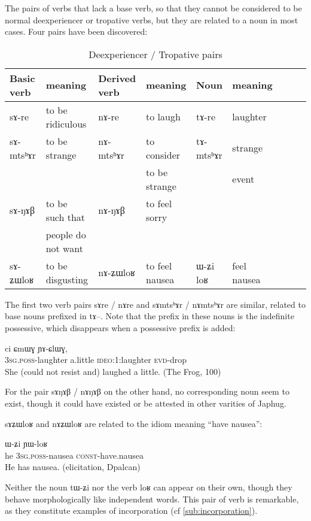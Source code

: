 \documentclass[oldfontcommands,oneside,a4paper,11pt]{memoir}
\newcommand{\ipa}[1]{{\phon #1}} %
\newcommand{\const}{\textsc{const}}
\newcommand{\evd}{\textsc{evd}}
\newcommand{\poss}{\textsc{poss}}
\newcommand{\sg}{\textsc{sg}}
\begin{document}
The pairs of  verbs that lack a base verb, so that they cannot be considered to be normal deexperiencer or tropative verbs, but they  are related to a noun in most cases. Four pairs have been discovered:
\begin{table}[H]
\caption{Deexperiencer / Tropative pairs } 
\begin{tabular}{lllllllll} \toprule
 
Basic verb	&meaning	&Derived verb	&meaning &Noun	&meaning\\
\midrule
\ipa{sɤ-re}  &	to be ridiculous 	& \ipa{nɤ-re}  &	  to laugh &\ipa{tɤ-re}  &	  laughter\\
\ipa{sɤ-mtsʰɤr}  &	to be strange 	& \ipa{nɤ-mtsʰɤr}  &	  to consider  &\ipa{tɤ-mtsʰɤr}  &	 strange\\

&&& to be strange && event \\
\ipa{sɤ-ŋɤβ}  &	to be such that   	& \ipa{nɤ-ŋɤβ}  &	  to feel sorry  & \\
& people do not want   \\
\ipa{sɤ-ʑɯloʁ}  &	to be disgusting 	& \ipa{nɤ-ʑɯloʁ}  &	  to feel nausea   & \ipa{ɯ-ʑi} \ipa{loʁ} & feel nausea \\ 
\bottomrule
\end{tabular}
\end{table}
The first two verb pairs \ipa{sɤre} / \ipa{nɤre} and  \ipa{sɤmtsʰɤr} / \ipa{nɤmtsʰɤr} are similar, related to base nouns prefixed in \ipa{tɤ}--. Note that the prefix in these nouns is the indefinite possessive, which disappears when a possessive prefix is added:
 \begin{exe}
\ex
\gll  \ipa{ɯ-re} 	\ipa{ci} 	\ipa{ɕmɯɣ} 	\ipa{ɲɤ-ɕlɯɣ,}   \\
 3\sg{}.\poss{}-laughter a.little   \textsc{ideo}:1:laughter \evd{}-drop \\
 \glt She (could not resist and) laughed a little.  (The Frog, 100)
\end{exe}   

For the pair \ipa{sɤŋɤβ} / \ipa{nɤŋɤβ} on the other hand, no corresponding noun seem to exist, though it could have existed or be attested in other varities of Japhug.

\ipa{sɤʑɯloʁ} and \ipa{nɤʑɯloʁ} are related to the idiom meaning ``have nausea'':
 \begin{exe}
\ex
\gll  \ipa{ɯʑo} \ipa{ɯ-ʑi} \ipa{ɲɯ-loʁ}  \\
 he 3\sg{}.\poss{}-nausea \const{}-have.nausea \\
 \glt He has nausea. (elicitation, Dpalcan)
\end{exe}  
Neither  the noun \ipa{tɯ-ʑi} nor the verb \ipa{loʁ} can appear on their own, though they behave morphologically like independent words. This pair of verb is remarkable, as they constitute examples of incorporation (cf \ref{sub:incorporation}).
\end{document}

